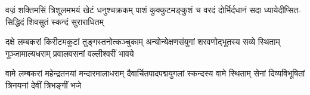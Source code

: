 {वज्रं शक्तिमसिं त्रिशूलमभयं खेटं धनुश्चक्रकम्}
{पाशं कुक्कुटमङ्कुशं च वरदं दोर्भिर्दधानं सदा}
{ध्यायेदीप्सित-सिद्धिदं शिवसुतं स्कन्दं सुराराधितम्}

{दक्षे लम्बकरां किरीटमकुटां तुङ्गस्तनोत्कञ्चुकाम्}
{अन्योन्येक्षणसंयुगां शरवणोद्भूतस्य सव्ये स्थिताम्}
{गुञ्जामाल्यधराम् प्रवालवसनां वल्लीश्वरीं भावये}

{वामे लम्बकरां महेन्द्रतनयां मन्दारमालाधराम्}
{दैवार्चितपादपद्मयुगलां स्कन्दस्य वामे स्थिताम्}
{सेनां दिव्यविभूषितां त्रिनयनां देवीं त्रिभङ्गीं भजे}

\closesection

